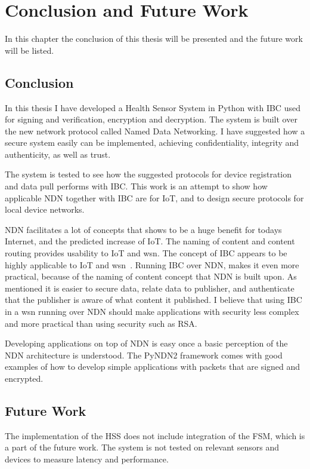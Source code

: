 \chapter{Conclusion and Future Work}\label{chp7:conclusion}
In this chapter the conclusion of this thesis will be presented and the future work will be listed.

\section{Conclusion}
In this thesis I have developed a Health Sensor System in Python with \gls{IBC} used for signing and verification, encryption and decryption.
The system is built over the new network protocol called Named Data Networking.
I have suggested how a secure system easily can be implemented, achieving confidentiality, integrity and authenticity, as well as trust.

The system is tested to see how the suggested protocols for device registration and data pull performs with \gls{IBC}. 
This work is an attempt to show how applicable \gls{NDN} together with \gls{IBC} are for \gls{IoT}, and to design secure protocols for local device networks.

\gls{NDN} facilitates a lot of concepts that shows to be a huge benefit for todays Internet, and the predicted increase of \gls{IoT}.
The naming of content and content routing provides usability to \gls{IoT} and \gls{wsn}.
The concept of \gls{IBC} appears to be highly applicable to \gls{IoT} and \gls{wsn}~\cite{Patil:2012:SWS:2464778}.
Running \gls{IBC} over \gls{NDN}, makes it even more practical, because of the naming of content concept that \gls{NDN} is built upon. 
As mentioned it is easier to secure data, relate data to publisher, and authenticate that the publisher is aware of what content it published. 
I believe that using \gls{IBC} in a \gls{wsn} running over \gls{NDN} should make applications with security less complex and more practical than using security such as RSA. 

Developing applications on top of \gls{NDN} is easy once a basic perception of the \gls{NDN} architecture is understood.
The \gls{PyNDN2} framework comes with good examples of how to develop simple applications with packets that are signed and encrypted.

\section{Future Work}
The implementation of the \gls{HSS} does not include integration of the \gls{FSM}, which is a part of the future work.
The system is not tested on relevant sensors and devices to measure latency and performance.

